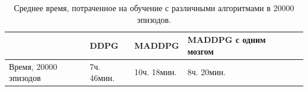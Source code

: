 \begin{table}[t!]
	\centering\small
	\caption{Среднее время, потраченное на обучение с различными алгоритмами в 20000 эпизодов.}
	\label{tab-sr-time}
	\begin{tabular}{|l|l|l|l|l|l|}
		\hline
		&DDPG&MADDPG&MADDPG с одним мозгом\\
		\hline
		Время, 20000 эпизодов&7ч. 46мин.&10ч. 18мин.&8ч. 20мин.\\ \hline
	\end{tabular}
	\normalsize%
\end{table}